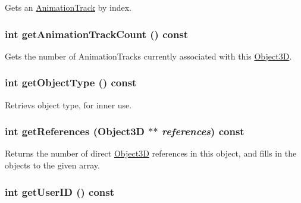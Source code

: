 Gets an \hyperlink{classm3g_1_1AnimationTrack}{AnimationTrack} by index. \hypertarget{classm3g_1_1Object3D_0926843b66090795972850376b8e4e6c}{
\subsubsection[{getAnimationTrackCount}]{\setlength{\rightskip}{0pt plus 5cm}int getAnimationTrackCount () const}}
\label{classm3g_1_1Object3D_0926843b66090795972850376b8e4e6c}


Gets the number of AnimationTracks currently associated with this \hyperlink{classm3g_1_1Object3D}{Object3D}. \hypertarget{classm3g_1_1Object3D_06be1b37b707b5f227cba2308043f3df}{
\subsubsection[{getObjectType}]{\setlength{\rightskip}{0pt plus 5cm}int getObjectType () const}}
\label{classm3g_1_1Object3D_06be1b37b707b5f227cba2308043f3df}


Retrievs object type, for inner use. \hypertarget{classm3g_1_1Object3D_d52d3c63076c4341b34c3631a17820e4}{
\subsubsection[{getReferences}]{\setlength{\rightskip}{0pt plus 5cm}int getReferences ({\bf Object3D} $\ast$$\ast$ {\em references}) const}}
\label{classm3g_1_1Object3D_d52d3c63076c4341b34c3631a17820e4}


Returns the number of direct \hyperlink{classm3g_1_1Object3D}{Object3D} references in this object, and fills in the objects to the given array. \hypertarget{classm3g_1_1Object3D_b8d9067364251d0208fcdc502d394e2c}{
\subsubsection[{getUserID}]{\setlength{\rightskip}{0pt plus 5cm}int getUserID () const}}
\label{classm3g_1_1Object3D_b8d9067364251d0208fcdc502d394e2c}


